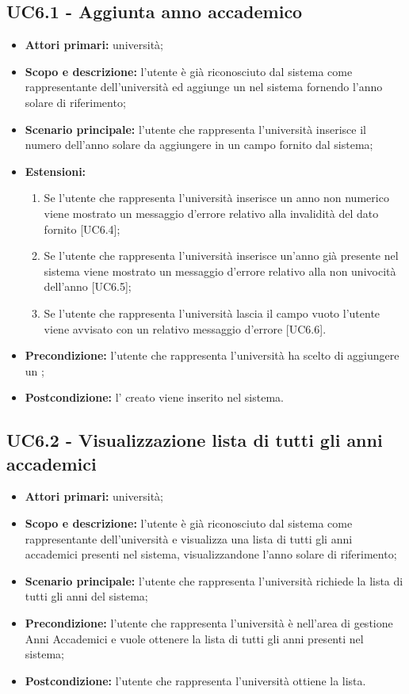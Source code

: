 \documentclass[AnalisiDeiRequisiti.tex]{subfiles}
\begin{document}
\subsection{UC6.1 - Aggiunta anno accademico}
\begin{itemize}
	\item \textbf{Attori primari:} università;
	\item \textbf{Scopo e descrizione:} l'utente è già riconosciuto dal sistema come rappresentante dell'università ed aggiunge un  nel sistema fornendo l'anno solare di riferimento;
	\item \textbf{Scenario principale:} l'utente che rappresenta l'università inserisce il numero dell'anno solare da aggiungere in un campo fornito dal sistema;
	\item \textbf{Estensioni:}
	\begin{enumerate}
		\item Se l'utente che rappresenta l'università inserisce un anno non numerico viene mostrato un messaggio d'errore relativo alla invalidità del dato fornito [UC6.4];
		\item Se l'utente che rappresenta l'università inserisce un'anno già presente nel sistema viene mostrato un messaggio d'errore relativo alla non univocità dell'anno [UC6.5];
		\item Se l'utente che rappresenta l'università lascia il campo vuoto l'utente viene avvisato con un relativo messaggio d'errore [UC6.6].
	\end{enumerate}
	\item \textbf{Precondizione:} l'utente che rappresenta l'università ha scelto di aggiungere un ; 
	\item \textbf{Postcondizione:} l' creato viene inserito nel sistema.
\end{itemize}
\subsection{UC6.2 - Visualizzazione lista di tutti gli anni accademici}
\begin{itemize}
	\item \textbf{Attori primari:} università;
	\item \textbf{Scopo e descrizione:} l'utente è già riconosciuto dal sistema come rappresentante dell'università e visualizza una lista di tutti gli anni accademici presenti nel sistema, visualizzandone l'anno solare di riferimento;
	\item \textbf{Scenario principale:} l'utente che rappresenta l'università richiede la lista di tutti gli anni del sistema;
	\item \textbf{Precondizione:} l'utente che rappresenta l'università è nell'area di gestione Anni Accademici e vuole ottenere la lista di tutti gli anni presenti nel sistema; 
	\item \textbf{Postcondizione:} l'utente che rappresenta l'università ottiene la lista.
\end{itemize}
\end{document}
